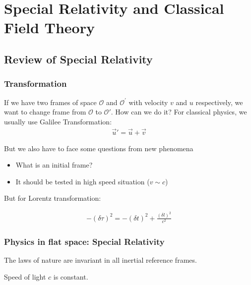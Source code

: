 \newpage

\mainmatter
{}
\chapter{Special Relativity and Classical Field Theory}

\section{Review of Special Relativity}

\subsection{Transformation}

If we have two frames of space $\mathcal{O} $ and $\mathcal{O} ^{'}$ with velocity $v$ and $u$ respectively, we want to change frame from $\mathcal{O}$ to $\mathcal{O}'$. How can we do it? For classical physics, we usually use Galilee Transformation:
\begin{align}
    \vec{u}'=\vec{u}+\vec{v}
\end{align}

But we also have to face some questions from new phenomena

\begin{itemize}
    \item What is an initial frame?
    \item It should be tested in high speed situation ($v\sim c$)
\end{itemize}

But for Lorentz transformation:

\begin{align}
    -(\delta \tau)^{2}=-(\delta t)^{2}+\frac{(\delta l)^{2}}{c^{2}}
\end{align}


\subsection{Physics in flat space: Special Relativity}

\begin{tcolorbox}[title=\textbf{Special Relativity},colback=SeaGreen!10!CornflowerBlue!10,colframe=RoyalPurple!55!Aquamarine!100!]
    The laws of nature are invariant in all inertial reference frames.

    Speed of light $c$ is constant.
\end{tcolorbox}



